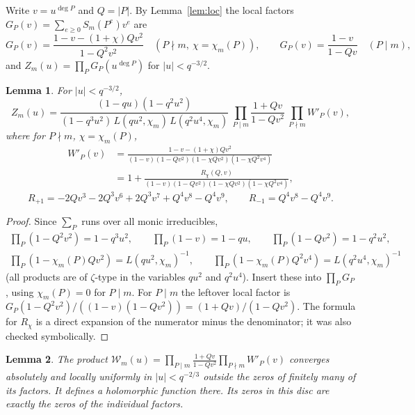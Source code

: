 \documentclass[11pt]{amsart}
\newtheorem{lemma}{Lemma}
\theoremstyle{remark}
\begin{document}
Write $v=u^{\deg P}$ and $Q=|P|$. By Lemma~\ref{lem:loc} the local factors $G_P(v)=\sum_{e\ge0}S_m(P^e)v^e$ are
\begin{equation}\label{eq:GP}
G_P(v)=\frac{1-v-(1+\chi)Qv^2}{1-Q^2v^2}\quad(P\nmid m,\ \chi=\chi_m(P)),\qquad G_P(v)=\frac{1-v}{1-Qv}\quad(P\mid m),
\end{equation}
and $Z_m(u)=\prod_PG_P(u^{\deg P})$ for $|u|<q^{-3/2}$.

\begin{lemma}\label{lem:fact}
For $|u|<q^{-3/2}$,
\begin{equation}\label{eq:fact}
Z_m(u)=\frac{(1-qu)(1-q^2u^2)}{(1-q^3u^2)\,L(qu^2,\chi_m)\,L(q^2u^4,\chi_m)}\ \prod_{P\mid m}\frac{1+Qv}{1-Qv^2}\ \prod_{P\nmid m}W'_P(v),
\end{equation}
where for $P\nmid m$, $\chi=\chi_m(P)$,
\begin{align*}
W'_P(v)&=\frac{1-v-(1+\chi)Qv^2}{(1-v)(1-Qv^2)(1-\chi Qv^2)(1-\chi Q^2v^4)}\\
&=1+\frac{R_\chi(Q,v)}{(1-v)(1-Qv^2)(1-\chi Qv^2)(1-\chi Q^2v^4)},
\end{align*}
\[
R_{+1}=-2Qv^3-2Q^3v^6+2Q^3v^7+Q^4v^8-Q^4v^9,\qquad R_{-1}=Q^4v^8-Q^4v^9 .
\]
\end{lemma}

\begin{proof}
Since $\sum_P$ runs over all monic irreducibles,
\begin{gather*}
\prod_P(1-Q^2v^2)=1-q^3u^2,\qquad \prod_P(1-v)=1-qu,\qquad \prod_P(1-Qv^2)=1-q^2u^2,\\
\prod_{P}(1-\chi_m(P)Qv^2)=L(qu^2,\chi_m)^{-1},\qquad \prod_P(1-\chi_m(P)Q^2v^4)=L(q^2u^4,\chi_m)^{-1}
\end{gather*}
(all products are of $\zeta$-type in the variables $qu^2$ and $q^2u^4$). Insert these into $\prod_PG_P$, using $\chi_m(P)=0$ for $P\mid m$. For $P\mid m$ the leftover local factor is $G_P(1-Q^2v^2)/((1-v)(1-Qv^2))=(1+Qv)/(1-Qv^2)$. The formula for $R_\chi$ is a direct expansion of the numerator minus the denominator; it was also checked symbolically.
\end{proof}

\begin{lemma}\label{lem:cont}
The product $\mathcal W_m(u)=\prod_{P\mid m}\frac{1+Qv}{1-Qv^2}\prod_{P\nmid m}W'_P(v)$ converges absolutely and locally uniformly in $|u|<q^{-2/3}$ outside the zeros of finitely many of its factors. It defines a holomorphic function there. Its zeros in this disc are exactly the zeros of the individual factors.
\end{lemma}
\end{document}

